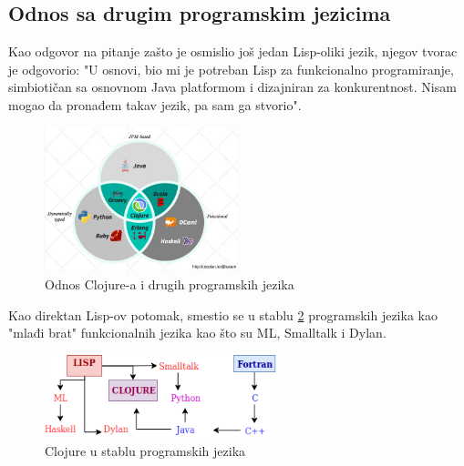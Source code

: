 \subsection{Odnos sa drugim programskim jezicima}
\label{subsec:drugijezici}

Kao odgovor na pitanje zašto je osmislio još jedan Lisp-oliki jezik, njegov tvorac je odgovorio: "U osnovi, bio mi je potreban Lisp za funkcionalno programiranje, simbiotičan sa osnovnom Java platformom i dizajniran za konkurentnost. Nisam mogao da pronađem takav jezik, pa sam ga stvorio"\cite{clojure}.


 \begin{figure}[h]
     \centering
     \includegraphics[width=0.5\textwidth]{Slike/clojure.png}
     \caption{Odnos Clojure-a i drugih programskih jezika\cite{diagram}}
     \label{fig:clojure_ostali}
 \end{figure}

Kao direktan Lisp-ov potomak, smestio se u stablu \ref{fig:stablo} programskih jezika  kao "mlađi brat" funkcionalnih jezika kao što su ML, Smalltalk i Dylan.

\begin{figure}[ht]
    \includegraphics[width=0.6\textwidth]{Slike/stablo2.png}
    \centering
    \caption{Clojure u stablu programskih jezika}
    \label{fig:stablo}
\end{figure}
